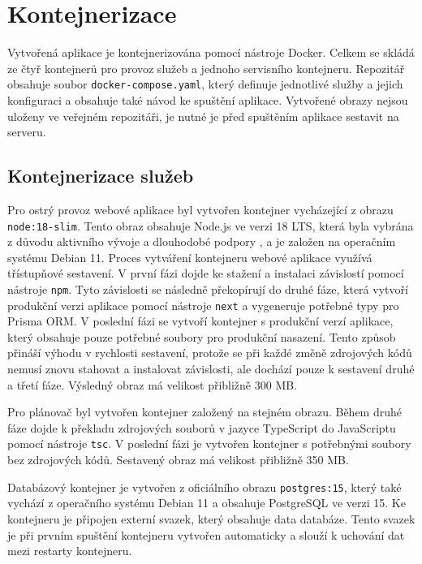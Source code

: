 \section{Kontejnerizace}

Vytvořená aplikace je kontejnerizována pomocí nástroje Docker. Celkem se skládá ze čtyř kontejnerů pro provoz služeb a jednoho servisního kontejneru.
Repozitář obsahuje soubor \texttt{docker-compose.yaml}, který definuje jednotlivé služby a jejich konfiguraci a obsahuje také návod ke spuštění aplikace.
Vytvořené obrazy nejsou uloženy ve veřejném repozitáři, je nutné je před spuštěním aplikace sestavit na serveru.

\subsection{Kontejnerizace služeb}

Pro ostrý provoz webové aplikace byl vytvořen kontejner vycházející z obrazu \texttt{node:18-slim}. Tento obraz obsahuje 
Node.js ve verzi 18 LTS, která byla vybrána z důvodu aktivního vývoje a dlouhodobé podpory \cite{node_releases}, a je založen na operačním systému Debian 11.
Proces vytváření kontejneru webové aplikace využívá třístupňové sestavení. V první fázi dojde ke stažení a instalaci závislostí pomocí nástroje \texttt{npm}.
Tyto závislosti se následně překopírují do druhé fáze, která vytvoří produkční verzi aplikace pomocí nástroje \texttt{next} a vygeneruje potřebné typy pro Prisma ORM.
V poslední fázi se vytvoří kontejner s produkční verzí aplikace, který obsahuje pouze potřebné soubory pro produkční nasazení.
Tento způsob přináší výhodu v rychlosti sestavení, protože se při každé změně
zdrojových kódů nemusí znovu stahovat a instalovat závislosti, ale dochází pouze k sestavení druhé a třetí fáze. Výsledný obraz má velikost přibližně 300 MB.

Pro plánovač byl vytvořen kontejner založený na stejném obrazu. Během druhé fáze dojde k překladu zdrojových souborů v jazyce TypeScript do JavaScriptu pomocí nástroje \texttt{tsc}.
V poslední fázi je vytvořen kontejner s potřebnými soubory bez zdrojových kódů. Sestavený obraz má velikost přibližně 350 MB. 

Databázový kontejner je vytvořen z oficiálního obrazu \texttt{postgres:15}, který také vychází z operačního systému Debian 11 a obsahuje PostgreSQL ve verzi 15.
Ke kontejneru je připojen externí svazek, který obsahuje data databáze. Tento svazek je při prvním spuštění kontejneru vytvořen automaticky a slouží k uchování dat mezi restarty kontejneru.

